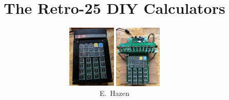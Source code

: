 \documentclass{beamer}
\begin{document}



\title{The Retro-25 DIY Calculators}
\author
{
 \begin{center}
   \includegraphics[height=3cm]{figs/led_front.jpg} 
   \includegraphics[height=3cm]{figs/vfd_over.jpg}
 \end{center}
E.~Hazen %
}

\newcommand{\spage}[1]{
\begin{frame}
  \begin{tikzpicture}[remember picture, overlay]
  \node[anchor=north]at(current page.north){
     \texttt{[image: \#1]}
  };
  \end{tikzpicture}
\end{frame}
}
\frame{\titlepage}
\end{document}
